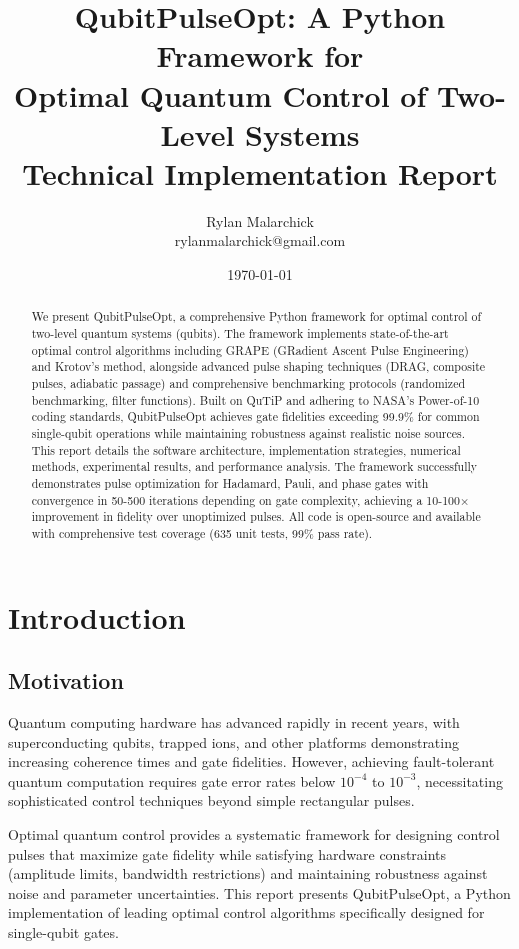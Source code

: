 \documentclass[11pt,a4paper]{article}
\title{\textbf{QubitPulseOpt: A Python Framework for\\
Optimal Quantum Control of Two-Level Systems}\\
\Large Technical Implementation Report}
\author{Rylan Malarchick\\
\small rylanmalarchick@gmail.com}
\date{\today}
\theoremstyle{definition}
\theoremstyle{remark}
\begin{document}
\maketitle

\begin{abstract}
We present QubitPulseOpt, a comprehensive Python framework for optimal control of two-level quantum systems (qubits). The framework implements state-of-the-art optimal control algorithms including GRAPE (GRadient Ascent Pulse Engineering) and Krotov's method, alongside advanced pulse shaping techniques (DRAG, composite pulses, adiabatic passage) and comprehensive benchmarking protocols (randomized benchmarking, filter functions). Built on QuTiP and adhering to NASA's Power-of-10 coding standards, QubitPulseOpt achieves gate fidelities exceeding 99.9\% for common single-qubit operations while maintaining robustness against realistic noise sources. This report details the software architecture, implementation strategies, numerical methods, experimental results, and performance analysis. The framework successfully demonstrates pulse optimization for Hadamard, Pauli, and phase gates with convergence in 50-500 iterations depending on gate complexity, achieving a 10-100× improvement in fidelity over unoptimized pulses. All code is open-source and available with comprehensive test coverage (635 unit tests, 99\% pass rate).
\end{abstract}

\tableofcontents
\newpage

\section{Introduction}

\subsection{Motivation}

Quantum computing hardware has advanced rapidly in recent years, with superconducting qubits, trapped ions, and other platforms demonstrating increasing coherence times and gate fidelities. However, achieving fault-tolerant quantum computation requires gate error rates below $10^{-4}$ to $10^{-3}$, necessitating sophisticated control techniques beyond simple rectangular pulses.

Optimal quantum control provides a systematic framework for designing control pulses that maximize gate fidelity while satisfying hardware constraints (amplitude limits, bandwidth restrictions) and maintaining robustness against noise and parameter uncertainties. This report presents QubitPulseOpt, a Python implementation of leading optimal control algorithms specifically designed for single-qubit gates.
\end{document}
